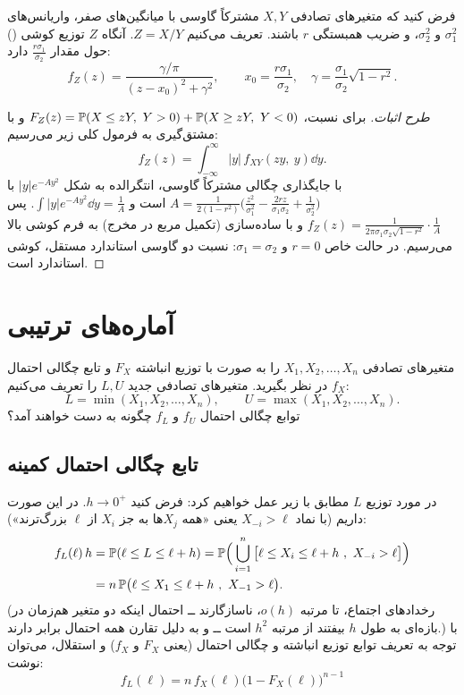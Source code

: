 \begin{theorem}
فرض کنید که متغیرهای تصادفی $X,Y$ مشترکاً گاوسی با میانگین‌های صفر، واریانس‌های $\sigma_1^2$ و $\sigma_2^2$، و ضریب همبستگی $r$ باشند. تعریف می‌کنیم $Z=X/Y$. آنگاه $Z$ توزیع کوشی () حول مقدار $\frac{r\sigma_1}{\sigma_2}$ دارد:
\[
f_Z(z)=\frac{\gamma/\pi}{(z-x_0)^2+\gamma^2},\qquad x_0=\frac{r\sigma_1}{\sigma_2},\quad\gamma=\frac{\sigma_1}{\sigma_2}\sqrt{1-r^2}.
\]
\end{theorem}
\begin{proof}[طرح اثبات]
برای نسبت، $F_Z(z)=\Prob(X\le zY,\ Y>0)+\Prob(X\ge zY,\ Y<0)$ و با مشتق‌گیری به فرمول کلی زیر می‌رسیم:
\[
f_Z(z)=\int_{-\infty}^{\infty}|y|\,f_{XY}(zy,\ y)\dd y .
\]
با جایگذاری چگالی مشترکاً گاوسی، انتگرالده به شکل $|y|e^{-Ay^2}$ با $A=\frac{1}{2(1-r^2)}\big(\frac{z^2}{\sigma_1^2}-\frac{2rz}{\sigma_1\sigma_2}+\frac{1}{\sigma_2^2}\big)$ است و $\int|y|e^{-Ay^2}\dd y=\frac1A$. پس
$f_Z(z)=\frac{1}{2\pi\sigma_1\sigma_2\sqrt{1-r^2}}\cdot\frac{1}{A}$ و با ساده‌سازی (تکمیل مربع در مخرج) به فرم کوشی بالا می‌رسیم. در حالت خاص $r=0$ و $\sigma_1=\sigma_2$: نسبت دو گاوسی استاندارد مستقل، کوشی استاندارد است.
\end{proof}

\section{آماره‌های ترتیبی }

متغیرهای تصادفی $X_1,X_2,\ldots,X_n$ را به صورت  با توزیع انباشته $F_X$ و تابع چگالی احتمال $f_X$ در نظر بگیرید. متغیرهای تصادفی جدید $L,U$ را تعریف می‌کنیم:
\[
L=\min(X_1,X_2,\ldots,X_n),\qquad U=\max(X_1,X_2,\ldots,X_n).
\]
توابع چگالی احتمال $f_U$ و $f_L$ چگونه به دست خواهند آمد؟

\subsection{تابع چگالی احتمال کمینه}
در مورد توزیع $L$ مطابق با زیر عمل خواهیم کرد: فرض کنید $h\to0^+$. در این صورت داریم (با نماد $X_{-i}>\ell$ یعنی «همه $X_j$ها به جز $X_i$ از $\ell$ بزرگ‌ترند»):
\[
\begin{aligned}
f_L(\ell)\,h&=\Prob(\ell\le L\le\ell+h)=\Prob\Big(\bigcup_{i=1}^{n}\big[\ell\le X_i\le\ell+h\ ,\ X_{-i}>\ell\big]\Big)\\
&=n\,\Prob\big(\ell\le X_1\le\ell+h\ ,\ X_{-1}>\ell\big).
\end{aligned}
\]
(رخدادهای اجتماع، تا مرتبه $o(h)$، ناسازگارند ــ احتمال اینکه دو متغیر هم‌زمان در بازه‌ای به طول $h$ بیفتند از مرتبه $h^2$ است ــ و به دلیل تقارن  همه احتمال برابر دارند.) با توجه به تعریف توابع توزیع انباشته و چگالی احتمال (یعنی $F_X$ و $f_X$) و استقلال، می‌توان نوشت:
\[
\boxed{\ f_L(\ell)=n\,f_X(\ell)\big(1-F_X(\ell)\big)^{n-1}\ }
\]

